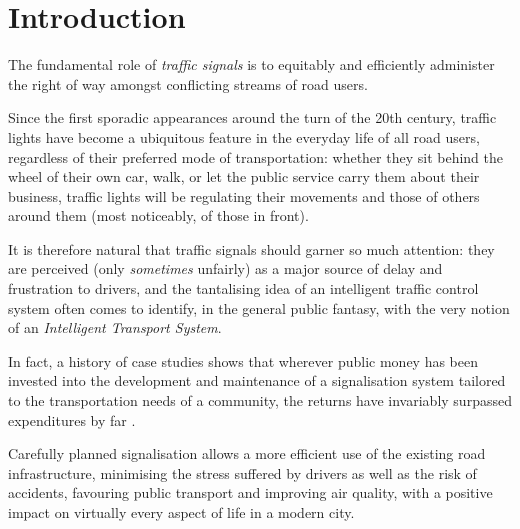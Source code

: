 \chapter*{Introduction}
The fundamental role of \emph{traffic signals} is to equitably and efficiently administer the right of way amongst conflicting streams of road users.

Since the first sporadic appearances around the turn of the 20th century, traffic lights have become a ubiquitous feature in the everyday life of all road users, regardless of their preferred mode of transportation: whether they sit behind the wheel of their own car, walk, or let the public service carry them about their business, traffic lights will be regulating their movements and those of others around them (most noticeably, of those in front).

It is therefore natural that traffic signals should garner so much attention: they are perceived (only \emph{sometimes} unfairly) as a major source of delay and frustration to drivers, and the tantalising idea of an intelligent traffic control system often comes to identify, in the general public fantasy, with the very notion of an \emph{Intelligent Transport System}.

In fact, a history of case studies shows that wherever public money has been invested into the development and maintenance of a signalisation system tailored to the transportation needs of a community, the returns have invariably surpassed expenditures by far \cite{koonce2008traffic}.

Carefully planned signalisation allows a more efficient use of the existing road infrastructure,
minimising the stress suffered by drivers as well as the risk of accidents,
favouring public transport and improving air quality, with a positive impact on virtually every aspect of life in a modern city.

